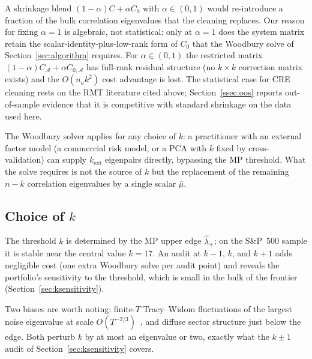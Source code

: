 \begin{remark}\label{rem:blend}
A shrinkage blend $(1-\alpha)C + \alpha C_0$ with $\alpha \in (0,1)$ would
re-introduce a fraction of the bulk correlation eigenvalues that the cleaning
replaces. Our reason for fixing $\alpha = 1$ is algebraic, not statistical: only at
$\alpha = 1$ does the system matrix retain the scalar-identity-plus-low-rank form
of $C_0$ that the Woodbury solve of Section~\ref{sec:algorithm} requires. For
$\alpha \in (0,1)$ the restricted matrix
$(1-\alpha)C_\mathcal{A} + \alpha C_{0,\mathcal{A}}$ has full-rank residual
structure (no $k \times k$ correction matrix exists) and the $O(n_a k^2)$ cost
advantage is lost. The statistical case for CRE cleaning rests on the RMT
literature cited above; Section~\ref{ssec:oos} reports out-of-sample
evidence that it is competitive with standard shrinkage on the data used here.
\end{remark}

\begin{remark}\label{rem:external_factors}
The Woodbury solver applies for any choice of $k$: a practitioner with an external
factor model (a commercial risk model, or a PCA with $k$ fixed by
cross-validation) can supply $k_{\mathrm{ext}}$ eigenpairs directly, bypassing the
MP threshold. What the solve requires is not the source of $k$ but the replacement
of the remaining $n - k$ correlation eigenvalues by a single scalar $\bar\mu$.
\end{remark}

\subsection{Choice of \texorpdfstring{$k$}{k}}\label{ssec:k_selection}

The threshold $k$ is determined by the MP upper edge $\hat\lambda_+$; on the
S\&P~500 sample it is stable near the central value $k = 17$. An audit at $k - 1$,
$k$, and $k + 1$ adds negligible cost (one extra Woodbury solve per audit point)
and reveals the portfolio's sensitivity to the threshold, which is small in the
bulk of the frontier (Section~\ref{sec:ksensitivity}).

Two biases are worth noting: finite-$T$ Tracy--Widom fluctuations of the largest
noise eigenvalue at scale $O(T^{-2/3})$~\cite{johnstone2001,elkaroui2008}, and
diffuse sector structure just below the edge. Both perturb $k$ by at most an
eigenvalue or two, exactly what the $k \pm 1$ audit of
Section~\ref{sec:ksensitivity} covers.
